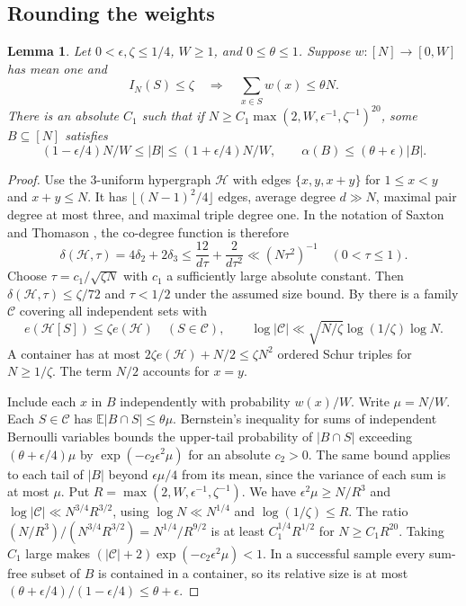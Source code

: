 \documentclass[11pt,reqno]{amsart}
\newtheorem{lemma}[theorem]{Lemma}
\newcommand{\E}{\mathbb E}
\numberwithin{equation}{section}
\begin{document}
\subsection{Rounding the weights}

\begin{lemma}\label{lem:round}
Let \(0<\epsilon,\zeta\le1/4\), \(W\ge1\), and \(0\le\theta\le1\).
Suppose \(w:[N]\to[0,W]\) has mean one and
\[
 I_N(S)\le\zeta \quad\Longrightarrow\quad
 \sum_{x\in S}w(x)\le\theta N.
\]
There is an absolute \(C_1\) such that if
\(N\ge C_1\max(2,W,\epsilon^{-1},\zeta^{-1})^{20}\), some
\(B\subseteq[N]\) satisfies
\[
 (1-\epsilon/4)N/W\le |B|\le(1+\epsilon/4)N/W,\qquad
 \alpha(B)\le(\theta+\epsilon)|B|.
\]
\end{lemma}

\begin{proof}
Use the \(3\)-uniform hypergraph \(\mathcal H\) with edges
\(\{x,y,x+y\}\) for \(1\le x<y\) and \(x+y\le N\).
It has \(\lfloor(N-1)^2/4\rfloor\) edges, average degree
\(d\gg N\), maximal pair degree at most three, and maximal
triple degree one. In the notation of Saxton and Thomason
\cite[Definition~3.2]{st}, the co-degree function is therefore
\[
 \delta(\mathcal H,\tau)=4\delta_2+2\delta_3
 \le \frac{12}{d\tau}+\frac{2}{d\tau^2}
 \ll (N\tau^2)^{-1}\quad (0<\tau\le1).
\]
Choose \(\tau=c_1/\sqrt{\zeta N}\) with \(c_1\) a sufficiently
large absolute constant. Then \(\delta(\mathcal H,\tau)\le\zeta/72\)
and \(\tau<1/2\) under the assumed size bound. By
\cite[Corollary~3.6]{st} there is a family \(\mathcal C\) covering
all independent sets with
\[
 e(\mathcal H[S])\le\zeta e(\mathcal H)\quad(S\in\mathcal C),\qquad
 \log|\mathcal C|\ll \sqrt{N/\zeta}\log(1/\zeta)\log N.
\]
A container has at most \(2\zeta e(\mathcal H)+N/2\le\zeta N^2\)
ordered Schur triples for \(N\ge1/\zeta\). The term \(N/2\)
accounts for \(x=y\).

Include each \(x\) in \(B\) independently with probability \(w(x)/W\).
Write \(\mu=N/W\). Each \(S\in\mathcal C\) has
\(\E|B\cap S|\le\theta\mu\). Bernstein's inequality for sums of
independent Bernoulli variables bounds the upper-tail probability of
\(|B\cap S|\) exceeding \((\theta+\epsilon/4)\mu\) by
\(\exp(-c_2\epsilon^2\mu)\) for an absolute \(c_2>0\).
The same bound applies to each tail of \(|B|\) beyond
\(\epsilon\mu/4\) from its mean, since the variance of each sum is
at most \(\mu\).
Put \(R=\max(2,W,\epsilon^{-1},\zeta^{-1})\). We have
\(\epsilon^2\mu\ge N/R^3\) and
\(\log|\mathcal C|\ll N^{3/4}R^{3/2}\), using
\(\log N\ll N^{1/4}\) and \(\log(1/\zeta)\le R\).
The ratio \((N/R^3)/(N^{3/4}R^{3/2})=N^{1/4}/R^{9/2}\) is at
least \(C_1^{1/4}R^{1/2}\) for \(N\ge C_1R^{20}\). Taking \(C_1\)
large makes \((|\mathcal C|+2)\exp(-c_2\epsilon^2\mu)<1\). In a successful sample every sum-free subset of \(B\)
is contained in a container, so its relative size is at most
\((\theta+\epsilon/4)/(1-\epsilon/4)\le\theta+\epsilon\).
\end{proof}
\end{document}
